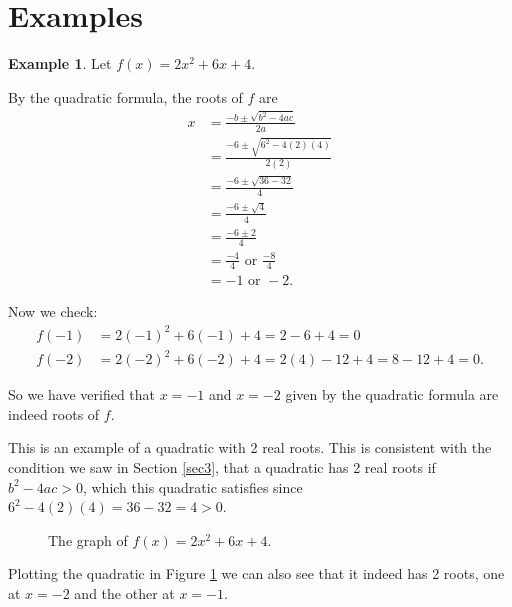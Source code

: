\documentclass[12pt, letterpaper]{article}
\theoremstyle{definition}
\newtheorem{ex}[thm]{Example}
\begin{document}
\section{Examples} \label{sec4}

\begin{ex}
  Let \(f(x) = 2x^2 + 6x + 4\).

  By the quadratic formula, the roots of \(f\) are
  \begin{align*}
  x &= \frac{-b \pm \sqrt{b^2 - 4ac}}{2a} \\
    &= \frac{-6 \pm \sqrt{6^2 - 4(2)(4)}}{2(2)} \\
    &= \frac{-6 \pm \sqrt{36 - 32}}{4} \\
    &= \frac{-6 \pm \sqrt{4}}{4} \\
    &= \frac{-6 \pm 2}{4} \\
    &= \frac{-4}{4} \text{ or } \frac{-8}{4} \\
    &= -1 \text{ or } -2.
  \end{align*}

  Now we check:
  \begin{align*}
    f(-1) &= 2(-1)^2 + 6(-1) + 4 = 2 - 6 + 4 = 0 \\
    f(-2) &= 2(-2)^2 + 6(-2) + 4 = 2(4) - 12 + 4 = 8 - 12 + 4 = 0.
  \end{align*}

  So we have verified that \(x=-1\) and \(x=-2\) given by the quadratic formula
  are indeed roots of \(f\).

  This is an example of a quadratic with 2 real roots. This is consistent with the condition
  we saw in Section \ref{sec3}, that a quadratic has 2 real roots if \(b^2 - 4a c > 0\),
  which this quadratic satisfies since \(6^2 - 4(2)(4) = 36 - 32 = 4 > 0\).

  \begin{figure}[ht]
      \centering
      \caption{The graph of $f(x)=2x^2+6x+4$.}
      \label{fig:graph1}
  \end{figure}

  Plotting the quadratic in Figure \ref{fig:graph1} we can also see that it indeed has 2 roots, one at \(x=-2\) and
  the other at \(x=-1\).
\end{ex}
\end{document}
